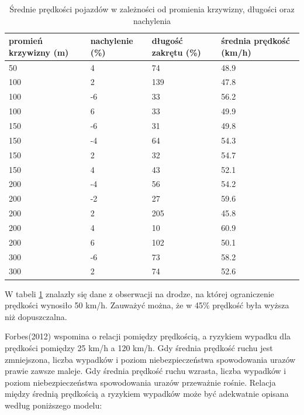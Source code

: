 \begin{table}[ht]
\centering
\caption{Średnie prędkości pojazdów w zależności od promienia krzywizny, długości oraz nachylenia}
\label{predkosciPromienKrzywizny}
\begin{tabular}{| l | l | l | l | }
\hline
\textbf{promień krzywizny (m)} & \textbf{nachylenie (\%)} & \textbf{długość zakrętu (\%)} & \textbf{średnia prędkość (km/h)} \\ \hline
50 & 4 & 74 & 48.9\\ \hline
100 & 2 & 139 & 47.8\\ \hline
100 & -6 & 33 & 56.2\\ \hline
100 & 6 & 33 & 49.9\\ \hline
150 & -6 & 31 & 49.8\\ \hline
150 & -4 & 64 & 54.3\\ \hline
150 & 2 & 32 & 54.7\\ \hline
150 & 4 & 43 & 52.1\\ \hline
200 & -4 & 56 & 54.2\\ \hline
200 & -2 & 27 & 59.6\\ \hline
200 & 2 & 205 & 45.8\\ \hline
200 & 4 & 10 & 60.9\\ \hline
200 & 6 & 102 & 50.1\\ \hline
300 & -6 & 73 & 58.2\\ \hline
300 & 2 & 74 & 52.6\\ \hline

\end{tabular}
\end{table}

W tabeli \ref{predkosciPromienKrzywizny} znalazły się dane z obserwacji na drodze, na której ograniczenie prędkości wynosiło 50 km/h. Zauważyć można, że w 45\% prędkość była wyższa niż  dopuszczalna.

Forbes(2012) wspomina o relacji pomiędzy prędkością, a ryzykiem wypadku dla prędkości pomiędzy 25 km/h a 120 km/h. Gdy średnia prędkość ruchu jest zmniejszona, liczba wypadków i  poziom niebezpieczeństwa spowodowania urazów prawie zawsze maleje. Gdy średnia prędkość ruchu wzrasta, liczba wypadków i poziom niebezpieczeństwa spowodowania urazów przeważnie rośnie. Relacja między średnią prędkością a ryzykiem wypadków może być adekwatnie opisana według poniższego modelu:


